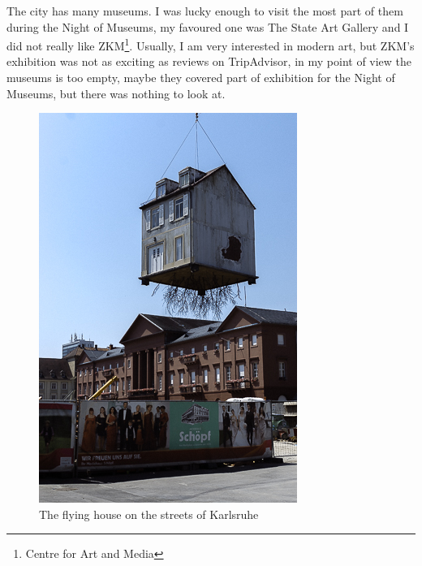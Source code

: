 \documentclass[english]{article}
\begin{document}
The city has many museums. I was lucky enough to visit the most part of them during the Night of Museums, my favoured one was The State Art Gallery and I did not really like ZKM\footnote{ Centre for Art and Media }. Usually, I am very interested in modern art, but ZKM's exhibition was not as exciting as reviews on TripAdvisor, in my point of view the museums is too empty, maybe they covered part of exhibition for the Night of Museums, but there was nothing to look at.

\begin{figure}
\centerline{\includegraphics[scale=0.5]{Germany_travel/karlsruhe}}
\caption{The flying house on the streets of Karlsruhe}
\end{figure}
\end{document}
